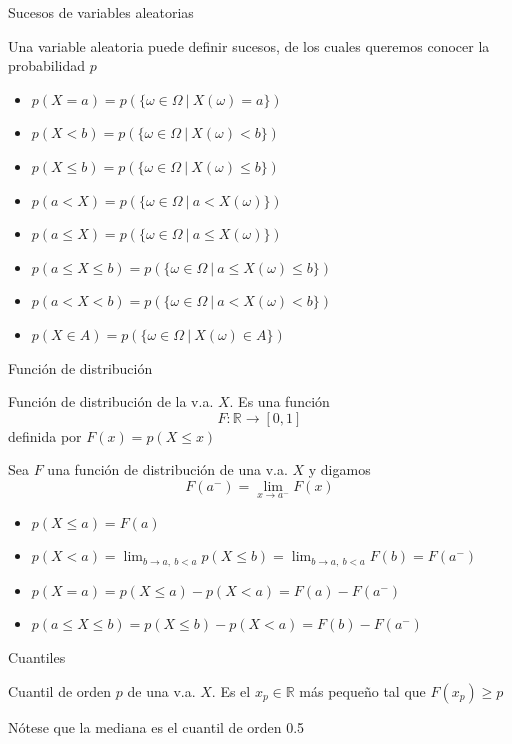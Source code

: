 \documentclass[
  ignorenonframetext,
]{beamer}
\providecommand{\tightlist}{%
  \setlength{\itemsep}{0pt}\setlength{\parskip}{0pt}}
\begin{document}
\begin{frame}{Sucesos de variables aleatorias}
\protect\hypertarget{sucesos-de-variables-aleatorias}{}

Una variable aleatoria puede definir sucesos, de los cuales queremos
conocer la probabilidad \(p\)

\begin{itemize}
\tightlist
\item
  \(p(X=a) = p(\{\omega\in\Omega \ |\  X(\omega) = a\})\)
\item
  \(p(X<b) = p(\{\omega\in\Omega \ |\  X(\omega) < b\})\)
\item
  \(p(X\le b) = p(\{\omega\in\Omega \ |\  X(\omega) \le b\})\)
\item
  \(p(a<X) = p(\{\omega\in\Omega \ |\  a<X(\omega)\})\)
\item
  \(p(a\le X) = p(\{\omega\in\Omega \ |\  a\le X(\omega)\})\)
\item
  \(p(a\le X\le b) = p(\{\omega\in\Omega \ |\  a\le X(\omega) \le b\})\)
\item
  \(p(a< X< b) = p(\{\omega\in\Omega \ |\  a< X(\omega) < b\})\)
\item
  \(p(X\in A) = p(\{\omega\in\Omega \ |\  X(\omega)\in A\})\)
\end{itemize}

\end{frame}

\begin{frame}{Función de distribución}
\protect\hypertarget{funciuxf3n-de-distribuciuxf3n}{}

Función de distribución de la v.a. \(X\). Es una función
\[F:\mathbb{R}\longrightarrow [0,1]\] definida por \(F(x)=p(X\le x)\)

Sea \(F\) una función de distribución de una v.a. \(X\) y digamos
\[F(a^-)=\lim_{x\rightarrow a^-}F(x)\]

\begin{itemize}
\tightlist
\item
  \(p(X\le a)=F(a)\)
\item
  \(p(X<a)=\lim_{b\rightarrow a,\  b<a}p(X\le b) = \lim_{b\rightarrow a,\  b<a} F(b) = F(a^-)\)
\item
  \(p(X=a) = p(X\le a)-p(X<a)=F(a)-F(a^-)\)
\item
  \(p(a\le X\le b) = p(X\le b)-p(X< a)=F(b)-F(a^-)\)
\end{itemize}

\end{frame}

\begin{frame}{Cuantiles}
\protect\hypertarget{cuantiles}{}

Cuantil de orden \(p\) de una v.a. \(X\). Es el \(x_p\in\mathbb{R}\) más
pequeño tal que \(F(x_p)\ge p\)

Nótese que la mediana es el cuantil de orden 0.5

\end{frame}
\end{document}

